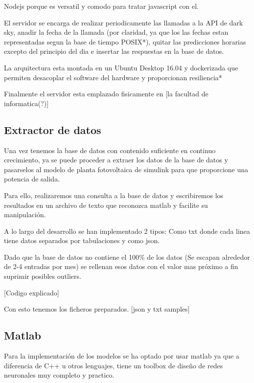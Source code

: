 Nodejs porque es versatil y comodo para tratar javascript con el.

El servidor se encarga de realizar periodicamente las llamadas a la API de dark sky, anadir la fecha de la llamada (por claridad, ya que los las fechas estan representadas segun la base de tiempo POSIX*), quitar las predicciones horarias excepto del principio del dia e insertar las respuestas en la base de datos.

La arquitectura esta montada en un Ubuntu Desktop 16.04 y dockerizada que permiten desacoplar el software del hardware y proporcionan resiliencia*

Finalmente el servidor esta emplazado fisicamente en [la facultad de informatica(?)] 



\subsection{Extractor de datos} 
\label{sub:extractor_de_datos}

Una vez tenemos la base de datos con contenido suficiente en continuo crecimiento, ya se puede proceder a extraer los datos de la base de datos y pasarselos al modelo de planta fotovoltaica de simulink para que proporcione una potencia de salida.

Para ello, realizaremos una consulta a la base de datos y escribiremos los resultados en un archivo de texto que reconozca matlab y facilite su manipulación.

A lo largo del desarrollo se han implementado 2 tipos: Como txt donde cada linea tiene datos separados por tabulaciones y como json.

Dado que la base de datos no contiene el 100\% de los datos (Se escapan alrededor de 2-4 entradas por mes) se rellenan esos datos con el valor mas próximo a fin suprimir posibles outliers.

[Codigo explicado]

Con esto tenemos los ficheros preparados.
[json y txt samples]



\subsection{Matlab}
\label{sub:Matlab} 

Para la implementación de los modelos se ha optado por usar matlab ya que a diferencia de C++ u otros lenguajes, tiene un toolbox de diseño de redes neuronales muy completo y practico.

